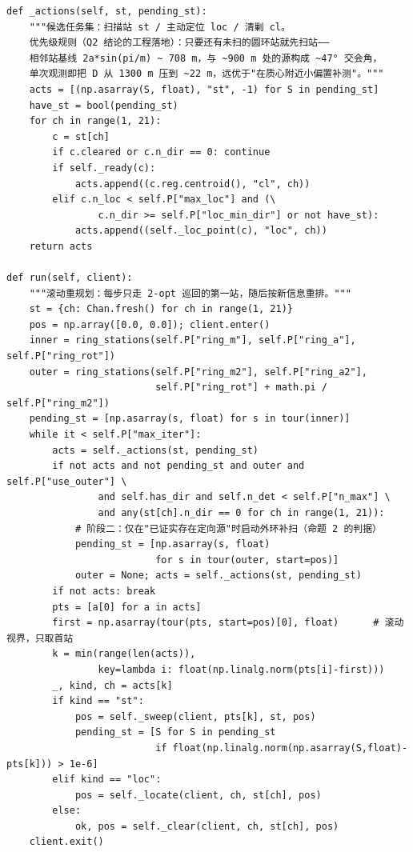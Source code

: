 \begin{verbatim}
def _actions(self, st, pending_st):
    """候选任务集：扫描站 st / 主动定位 loc / 清剿 cl。
    优先级规则（Q2 结论的工程落地）：只要还有未扫的圆环站就先扫站——
    相邻站基线 2a*sin(pi/m) ~ 708 m，与 ~900 m 处的源构成 ~47° 交会角，
    单次观测即把 D 从 1300 m 压到 ~22 m，远优于"在质心附近小偏置补测"。"""
    acts = [(np.asarray(S, float), "st", -1) for S in pending_st]
    have_st = bool(pending_st)
    for ch in range(1, 21):
        c = st[ch]
        if c.cleared or c.n_dir == 0: continue
        if self._ready(c):
            acts.append((c.reg.centroid(), "cl", ch))
        elif c.n_loc < self.P["max_loc"] and (\
                c.n_dir >= self.P["loc_min_dir"] or not have_st):
            acts.append((self._loc_point(c), "loc", ch))
    return acts

def run(self, client):
    """滚动重规划：每步只走 2-opt 巡回的第一站，随后按新信息重排。"""
    st = {ch: Chan.fresh() for ch in range(1, 21)}
    pos = np.array([0.0, 0.0]); client.enter()
    inner = ring_stations(self.P["ring_m"], self.P["ring_a"], self.P["ring_rot"])
    outer = ring_stations(self.P["ring_m2"], self.P["ring_a2"],
                          self.P["ring_rot"] + math.pi / self.P["ring_m2"])
    pending_st = [np.asarray(s, float) for s in tour(inner)]
    while it < self.P["max_iter"]:
        acts = self._actions(st, pending_st)
        if not acts and not pending_st and outer and self.P["use_outer"] \
                and self.has_dir and self.n_det < self.P["n_max"] \
                and any(st[ch].n_dir == 0 for ch in range(1, 21)):
            # 阶段二：仅在"已证实存在定向源"时启动外环补扫（命题 2 的判据）
            pending_st = [np.asarray(s, float)
                          for s in tour(outer, start=pos)]
            outer = None; acts = self._actions(st, pending_st)
        if not acts: break
        pts = [a[0] for a in acts]
        first = np.asarray(tour(pts, start=pos)[0], float)      # 滚动视界，只取首站
        k = min(range(len(acts)),
                key=lambda i: float(np.linalg.norm(pts[i]-first)))
        _, kind, ch = acts[k]
        if kind == "st":
            pos = self._sweep(client, pts[k], st, pos)
            pending_st = [S for S in pending_st
                          if float(np.linalg.norm(np.asarray(S,float)-pts[k])) > 1e-6]
        elif kind == "loc":
            pos = self._locate(client, ch, st[ch], pos)
        else:
            ok, pos = self._clear(client, ch, st[ch], pos)
    client.exit()
\end{verbatim}

